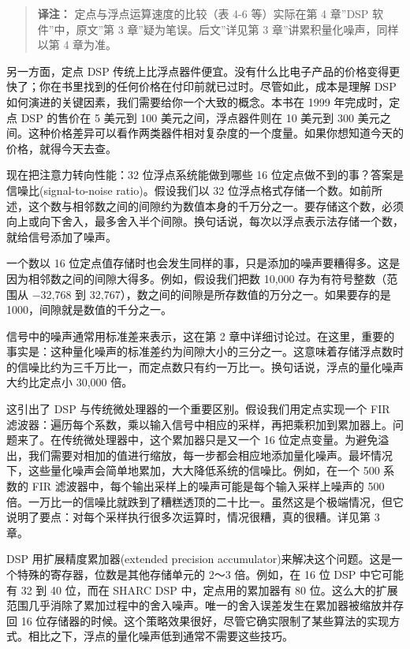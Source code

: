 \begin{quote}
\textbf{译注：} 定点与浮点运算速度的比较（表 4-6 等）实际在第 4 章''DSP
软件''中，原文''第 3 章''疑为笔误。后文''详见第 3
章''讲累积量化噪声，同样以第 4 章为准。
\end{quote}

另一方面，定点 DSP
传统上比浮点器件便宜。没有什么比电子产品的价格变得更快了；你在书里找到的任何价格在付印前就已过时。尽管如此，成本是理解
DSP 如何演进的关键因素，我们需要给你一个大致的概念。本书在 1999
年完成时，定点 DSP 的售价在 5 美元到 100 美元之间，浮点器件则在 10
美元到 300
美元之间。这种价格差异可以看作两类器件相对复杂度的一个度量。如果你想知道今天的价格，就得今天去查。

现在把注意力转向性能：32 位浮点系统能做到哪些 16
位定点做不到的事？答案是信噪比(signal-to-noise ratio)。假设我们以 32
位浮点格式存储一个数。如前所述，这个数与相邻数之间的间隙约为数值本身的千万分之一。要存储这个数，必须向上或向下舍入，最多舍入半个间隙。换句话说，每次以浮点表示法存储一个数，就给信号添加了噪声。

一个数以 16
位定点值存储时也会发生同样的事，只是添加的噪声要糟得多。这是因为相邻数之间的间隙大得多。例如，假设我们把数
10,000 存为有符号整数（范围从 −32,768 到
32,767），数之间的间隙是所存数值的万分之一。如果要存的是
1000，间隙就是数值的千分之一。

信号中的噪声通常用标准差来表示，这在第 2
章中详细讨论过。在这里，重要的事实是：这种量化噪声的标准差约为间隙大小的三分之一。这意味着存储浮点数时的信噪比约为三千万比一，而定点数只有约一万比一。换句话说，浮点的量化噪声大约比定点小
30,000 倍。

这引出了 DSP 与传统微处理器的一个重要区别。假设我们用定点实现一个 FIR
滤波器：遍历每个系数，乘以输入信号中相应的采样，再把乘积加到累加器上。问题来了。在传统微处理器中，这个累加器只是又一个
16
位定点变量。为避免溢出，我们需要对相加的值进行缩放，每一步都会相应地添加量化噪声。最坏情况下，这些量化噪声会简单地累加，大大降低系统的信噪比。例如，在一个
500 系数的 FIR 滤波器中，每个输出采样上的噪声可能是每个输入采样上噪声的
500
倍。一万比一的信噪比就跌到了糟糕透顶的二十比一。虽然这是个极端情况，但它说明了要点：对每个采样执行很多次运算时，情况很糟，真的很糟。详见第
3 章。

DSP 用扩展精度累加器(extended precision
accumulator)来解决这个问题。这是一个特殊的寄存器，位数是其他存储单元的
2～3 倍。例如，在 16 位 DSP 中它可能有 32 到 40 位，而在 SHARC DSP
中，定点用的累加器有 80
位。这么大的扩展范围几乎消除了累加过程中的舍入噪声。唯一的舍入误差发生在累加器被缩放并存回
16
位存储器的时候。这个策略效果很好，尽管它确实限制了某些算法的实现方式。相比之下，浮点的量化噪声低到通常不需要这些技巧。

